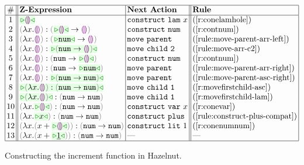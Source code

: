 \begin{figure}[t!]
  \label{ex1}
\begin{center}
$\arraycolsep=2px
\begin{array}[p]{|c||l|l||l|l|}
\hline
\# & \textbf{Z-Expression} &
\textbf{Next Action} & \textbf{Rule}
\\
\hline
1 &
\zwsel{\hhole{}} &
\aConstruct{\flam{x}} &
\text{(\ref{r:conelamhole})}
\\ 2 &
{\hlam{x}{\hhole{}}} : \tarr{\zwsel{\hhole{}}}{\hhole{}} &
\aConstruct{\fnum{}} &
\text{(\ref{r:contnum})}
\\ 3 &
{\hlam{x}{\hhole{}}} : \tarr{\zwsel{\tnum{}}}{\hhole{}} &
\aMove{\dParent} &
\text{({\ref{rule:move-parent-arr-left}})}
\\ 4 &
{\hlam{x}{\hhole{}}} : \zwsel{\tarr{\tnum{}}{\hhole{}}} &
\aMove{\dChildn{2}} &
\text{({\ref{rule:move-arr-c2}})}
\\ 5 &
{\hlam{x}{\hhole{}}} : \tarr{\tnum}{\zwsel{\hhole{}}}
&
\aConstruct{\fnum{}} &
\text{(\ref{r:contnum})}
\\ 6 &
{\hlam{x}{\hhole{}}} : \tarr{\tnum{}}{\zwsel{\tnum{}}} &
\aMove{\dParent{}} &
\text{(\ref{rule:move-parent-arr-right})}
\\ 7 &
{\hlam{x}{\hhole{}}} : \zwsel{\tarr{\tnum{}}{\tnum{}}}
&
\aMove{\dParent{}} &
\text{(\ref{rule:move-parent-asc-right})}
\\ 8 &
\zwsel{{\hlam{x}{\hhole{}}} : \tarr{\tnum}{\tnum}} &
\aMove{\dChildn{1}} &
\text{(\ref{r:movefirstchild-asc})}
\\ 9 &
{\zwsel{\hlam{x}{\hhole{}}}} : \tarr{\tnum{}}{\tnum{}} &
\aMove{\dChildn{1}} &
\text{(\ref{r:movefirstchild-lam})}
\\ 10 &
{\hlam{x}{\zwsel{\hhole{}}}} : \tarr{\tnum{}}{\tnum{}} &
\aConstruct{\fvar{x}} &
\text{(\ref{r:conevar})}
\\ 11 &
{\hlam{x}{\zwsel{{x}}}} : \tarr{\tnum{}}{\tnum{}} &
{\aConstruct{\fplus}}
&
\text{(\ref{rule:construct-plus-compat})}
\\ 12 &
{\hlam{x}{\hadd{x}{\zwsel{\hhole{}}}}} : \tarr{\tnum{}}{\tnum{}} &
\aConstruct{\fnumlit{1}} &
\text{(\ref{r:conenumnum})}
\\ 13 &
{\hlam{x}{\hadd{x}{\zwsel{\hnum{1}}}}} : \tarr{\tnum}{\tnum} &
\textrm{---} &
{\textrm{---}}
\\ \hline
\end{array}
$\end{center}\vspace{-6px}
\caption{Constructing the increment function in Hazelnut.}
\label{fig:first-example}
\end{figure}

